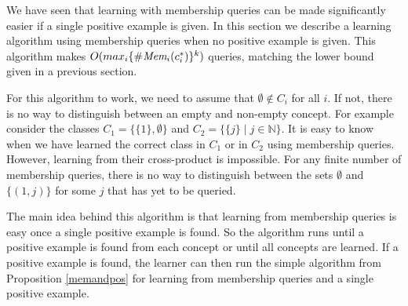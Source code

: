 We have seen that learning with membership queries can be made significantly easier if a single positive example is given. 
In this section we describe a learning algorithm using membership queries when no positive example is given. 
This algorithm makes $O(max_i \{ \#\emph{Mem}_{i}(c^*_i) \}^k)$ queries, matching the lower bound given in a previous section. 

For this algorithm to work, we need to assume that $\emptyset \not\in C_i$ for all $i$.
If not, there is no way to distinguish between an empty and non-empty concept. 
For example consider the classes $C_1 = \{ \{1\}, \emptyset \}$ and $C_2 = \{ \{j \} \mid j \in \mathbb{N} \}$. 
It is easy to know when we have learned the correct class in $C_1$ or in $C_2$ using membership queries. 
However, learning from their cross-product is impossible. 
For any finite number of membership queries, there is no way to distinguish between the sets $\emptyset$ and $\{(1,j)\}$ for some $j$ that has yet to be queried.


The main idea behind this algorithm is that learning from membership queries is easy once a single positive example is found. 
So the algorithm runs until a positive example is found from each concept or until all concepts are learned. 
If a positive example is found, the learner can then run the simple algorithm from Proposition \ref{memandpos} for learning from membership queries and a single positive example. 


